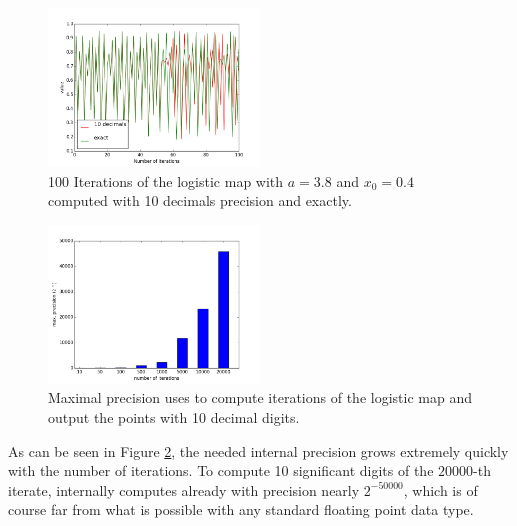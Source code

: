   \begin{figure}[h]
    \centering
    \includegraphics[width=0.5\textwidth]{img/dynamic_systems/logmap1}
    \caption{100 Iterations of the logistic map with $a=3.8$ and $x_0 = 0.4$ computed with 10 decimals precision and exactly.}
    \label{fig:logmaperror1}  
  \end{figure}
    \begin{figure}
    \centering
    \includegraphics[width=0.5\textwidth]{img/dynamic_systems/logmap2}
    \caption{Maximal precision \irram uses to compute iterations of the logistic map and output the points with 10 decimal digits.}
    \label{fig:logmapprec}
  \end{figure}
  As can be seen in Figure \ref{fig:logmapprec}, the needed internal precision
  grows extremely quickly with the number of iterations.  
  To compute 10 significant digits of the $20000$-th iterate, \irram internally
  computes already with precision nearly $2^{-50000}$, which is of course far
  from what is possible with any standard floating point data type.   
